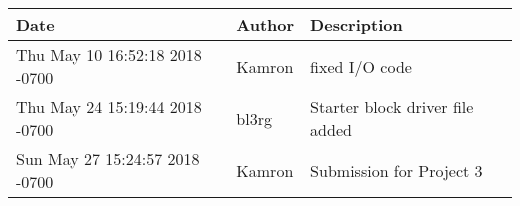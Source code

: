 \begin{tabular}{l l l}\textbf{Date} & \textbf{Author} & \textbf{Description}\\\hline
Thu May 10 16:52:18 2018 -0700 & Kamron & fixed I/O code\\\hline
Thu May 24 15:19:44 2018 -0700 & bl3rg & Starter block driver file added\\\hline
Sun May 27 15:24:57 2018 -0700 & Kamron & Submission for Project 3\\\hline\end{tabular}
